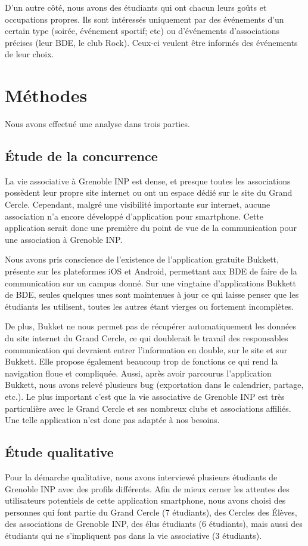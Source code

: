 \documentclass[a4paper, 11px]{article}
\begin{document}
D'un autre côté, nous avons des étudiants qui ont chacun leurs goûts et occupations propres. Ils sont intéressés uniquement par des événements d'un certain type (soirée, événement sportif; etc) ou d'événements d'associations précises (leur BDE, le club Rock). Ceux-ci veulent être informés des événements de leur choix.

\newpage

\section{Méthodes}

Nous avons effectué une analyse dans trois parties. 

\subsection{Étude de la concurrence}
La vie associative à Grenoble INP est dense, et presque toutes les associations possèdent leur propre site internet ou ont un espace dédié sur le site du Grand Cercle.
Cependant, malgré une visibilité importante sur internet, aucune association n'a encore développé d'application pour smartphone. Cette application serait donc une première du point de vue de la communication pour une association à Grenoble INP.

Nous avons pris conscience de l'existence de l'application gratuite Bukkett, présente sur les plateformes iOS et Android, permettant aux BDE de faire de la communication sur un campus donné. Sur une vingtaine d'applications Bukkett de BDE, seules quelques unes sont maintenues à jour ce qui laisse penser que les étudiants les utilisent, toutes les autres étant vierges ou fortement incomplètes. 

De plus, Bukket ne nous permet pas de récupérer automatiquement les données du site internet du Grand Cercle, ce qui doublerait le travail des responsables communication qui devraient entrer l'information en double, sur le site et sur Bukkett. Elle propose également beaucoup trop de fonctions ce qui rend la navigation floue et compliquée. Aussi, après avoir parcourus l'application Bukkett, nous avons relevé plusieurs bug  (exportation dans le calendrier, partage, etc.). Le plus important c'est que la vie associative de Grenoble INP est très particulière avec le Grand Cercle et ses nombreux clubs et associations affiliés. Une telle application n'est donc pas adaptée à nos besoins.

\subsection{Étude qualitative}
Pour la démarche qualitative, nous avons interviewé plusieurs étudiants de Grenoble INP avec des profils différents. Afin de mieux cerner les attentes des utilisateurs potentiels de cette application smartphone, nous avons choisi des personnes qui font partie du Grand Cercle (7 étudiants), des Cercles des Élèves, des associations de Grenoble INP, des élus étudiants (6 étudiants),  mais aussi des étudiants qui ne s'impliquent pas dans la vie associative (3 étudiants).
\end{document}
